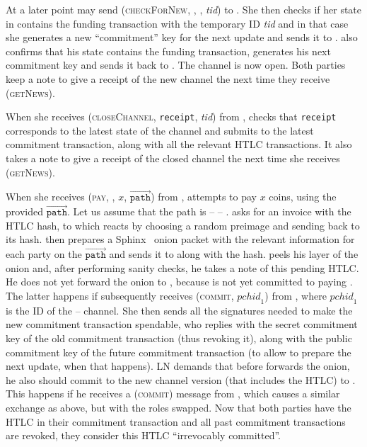     At a later point \environment{} may send (\textsc{checkForNew}, \alice,
    \bob, \textit{tid}) to \alice. She then checks if her state in \ledger{}
    contains the funding transaction with the temporary ID \textit{tid} and in
    that case she generates a new ``commitment'' key for the next update and
    sends it to \bob. \bob{} also confirms that his state contains the funding
    transaction, generates his next commitment key and sends it back to \alice.
    The channel is now open. Both parties keep a note to give \environment{}
    a receipt of the new channel the next time they receive (\textsc{getNews}).

    When she receives (\textsc{closeChannel}, \texttt{receipt}, \textit{tid})
    from \environment, \alice{} checks that \texttt{receipt} corresponds to the
    latest state of the channel and submits to \ledger{} the latest commitment
    transaction, along with all the relevant HTLC transactions. It also takes a
    note to give \environment{} a receipt of the closed channel the next time
    she receives (\textsc{getNews}).

    When she receives (\textsc{pay}, \charlie, $x$,
    $\overrightarrow{\mathtt{path}}$) from \environment, \alice{} attempts to
    pay \charlie{} $x$ coins, using the provided
    $\overrightarrow{\mathtt{path}}$. Let us assume that the path is \alice{} --
    \bob{} -- \charlie. \alice{} asks \charlie{} for an invoice with the HTLC
    hash, to which \charlie{} reacts by choosing a random preimage and sending
    back to \alice{} its hash. \alice{} then prepares a Sphinx~\cite{sphinx}
    onion packet with the relevant information for each party on the
    $\overrightarrow{\mathtt{path}}$ and sends it to \bob{} along with the hash.
    \bob{} peels his layer of the onion and, after performing sanity checks, he
    takes a note of this pending HTLC. He does not yet forward the onion to
    \charlie, because \alice{} is not yet committed to paying \bob. The latter
    happens if \alice{} subsequently receives (\textsc{commit},
    $\mathit{pchid}_1$) from \environment, where $\mathit{pchid}_1$ is the ID of
    the \alice{} -- \bob{} channel. She then sends \bob{} all the signatures
    needed to make the new commitment transaction spendable, who replies with
    the secret commitment key of the old commitment transaction (thus revoking
    it), along with the public commitment key of the future commitment
    transaction (to allow \alice{} to prepare the next update, when that
    happens). LN demands that before \bob{} forwards the onion, he also should
    commit to the new channel version (that includes the HTLC) to \alice. This
    happens if he receives a (\textsc{commit}) message from \environment, which
    causes a similar exchange as above, but with the roles swapped. Now that
    both parties have the HTLC in their commitment transaction and all past
    commitment transactions are revoked, they consider this HTLC ``irrevocably
    committed''.

